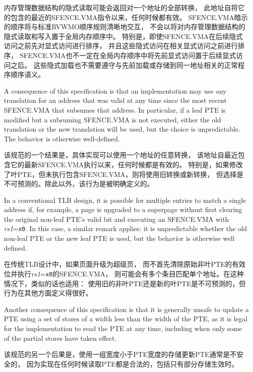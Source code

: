 内存管理数据结构的隐式读取可能会返回对一个地址的全部转换，
此地址自将它的包含的最近的SFENCE.VMA指令以来，任何时候都有效。
SFENCE.VMA暗示的顺序将与标准RVWMO顺序规则清晰地交互，
不会以将对内存管理数据结构的隐式读取和写入置于全局内存顺序中。
特别是，即使SFENCE.VMA在后续隐式访问之前先对显式访问进行排序，
并且这些隐式访问在相关显式访问之前进行排序，
SFENCE.VMA也不一定在全局内存顺序中将先前显式访问置于后续显式访问之后。
这些隐式加载也不需要遵守与先前加载或存储到同一地址相关的正常程序顺序语义。

\begin{commentary}

A consequence of this specification is that an implementation may use any
translation for an address that was valid at any time since the most recent
SFENCE.VMA that subsumes that address.
In particular, if a leaf PTE is modified but a subsuming SFENCE.VMA is not
executed, either the old translation or the new translation will be used, but
the choice is unpredictable.
The behavior is otherwise well-defined.

该规范的一个结果是，具体实现可以使用一个地址的任意转换，
该地址自最近包含它的最新SFENCE.VMA执行以来，任何时候都是有效的。
特别是，如果修改了叶PTE，但未执行包含SFENCE.VMA，则将使用旧转换或新转换，
但选择是不可预测的。除此以外，该行为是被明确定义的。

In a conventional TLB design, it is possible for multiple entries to match a
single address if, for example, a page is upgraded to a superpage without first
clearing the original non-leaf PTE's valid bit and executing an SFENCE.VMA with
{\em rs1}={\tt x0}.
In this case, a similar remark applies: it is unpredictable whether the old
non-leaf PTE or the new leaf PTE is used, but the behavior is otherwise well
defined.

在传统TLB设计中，如果页面升级为超级页，
而不首先清除原始非叶PTE的有效位并执行{\em rs1}={\tt x0}的SFENCE.VMA，
则可能会有多个条目匹配单个地址。在这种情况下，类似的话也适用：
使用旧的非叶PTE还是新的叶PTE是不可预测的，但行为在其他方面定义得很好。

Another consequence of this specification is that it is generally unsafe to
update a PTE using a set of stores of a width less than the width of the PTE,
as it is legal for the implementation to read the PTE at any time, including
when only some of the partial stores have taken effect.

该规范的另一个后果是，使用一组宽度小于PTE宽度的存储更新PTE通常是不安全的，
因为实现在任何时候读取PTE都是合法的，包括只有部分存储生效时。
\end{commentary}

